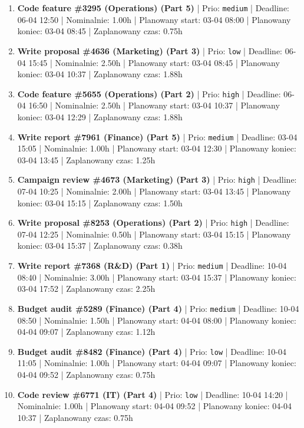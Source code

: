 {\footnotesize
\begin{enumerate}
  \item [\textbf{14645}] \textbf{Code feature \#3295 (Operations) (Part 5)} | Prio: \texttt{medium} | Deadline: 06-04 12:50 | Nominalnie: 1.00h | Planowany start: 03-04 08:00 | Planowany koniec: 03-04 08:45 | Zaplanowany czas: 0.75h
  \item [\textbf{14684}] \textbf{Write proposal \#4636 (Marketing) (Part 3)} | Prio: \texttt{low} | Deadline: 06-04 15:45 | Nominalnie: 2.50h | Planowany start: 03-04 08:45 | Planowany koniec: 03-04 10:37 | Zaplanowany czas: 1.88h
  \item [\textbf{14626}] \textbf{Code feature \#5655 (Operations) (Part 2)} | Prio: \texttt{high} | Deadline: 06-04 16:50 | Nominalnie: 2.50h | Planowany start: 03-04 10:37 | Planowany koniec: 03-04 12:29 | Zaplanowany czas: 1.88h
  \item [\textbf{14657}] \textbf{Write report \#7961 (Finance) (Part 5)} | Prio: \texttt{medium} | Deadline: 03-04 15:05 | Nominalnie: 1.00h | Planowany start: 03-04 12:30 | Planowany koniec: 03-04 13:45 | Zaplanowany czas: 1.25h
  \item [\textbf{14625}] \textbf{Campaign review \#4673 (Marketing) (Part 3)} | Prio: \texttt{high} | Deadline: 07-04 10:25 | Nominalnie: 2.00h | Planowany start: 03-04 13:45 | Planowany koniec: 03-04 15:15 | Zaplanowany czas: 1.50h
  \item [\textbf{14614}] \textbf{Write proposal \#8253 (Operations) (Part 2)} | Prio: \texttt{high} | Deadline: 07-04 12:25 | Nominalnie: 0.50h | Planowany start: 03-04 15:15 | Planowany koniec: 03-04 15:37 | Zaplanowany czas: 0.38h
  \item [\textbf{14633}] \textbf{Write report \#7368 (R\&D) (Part 1)} | Prio: \texttt{medium} | Deadline: 10-04 08:40 | Nominalnie: 3.00h | Planowany start: 03-04 15:37 | Planowany koniec: 03-04 17:52 | Zaplanowany czas: 2.25h
  \item [\textbf{14630}] \textbf{Budget audit \#5289 (Finance) (Part 4)} | Prio: \texttt{medium} | Deadline: 10-04 08:50 | Nominalnie: 1.50h | Planowany start: 04-04 08:00 | Planowany koniec: 04-04 09:07 | Zaplanowany czas: 1.12h
  \item [\textbf{14694}] \textbf{Budget audit \#8482 (Finance) (Part 4)} | Prio: \texttt{low} | Deadline: 10-04 11:05 | Nominalnie: 1.00h | Planowany start: 04-04 09:07 | Planowany koniec: 04-04 09:52 | Zaplanowany czas: 0.75h
  \item [\textbf{14681}] \textbf{Code review \#6771 (IT) (Part 4)} | Prio: \texttt{low} | Deadline: 10-04 14:20 | Nominalnie: 1.00h | Planowany start: 04-04 09:52 | Planowany koniec: 04-04 10:37 | Zaplanowany czas: 0.75h

\end{enumerate}}
